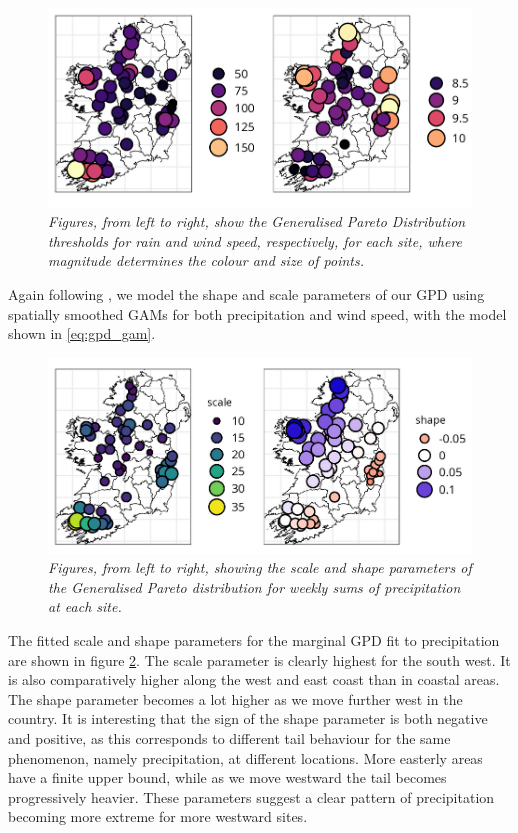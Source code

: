\documentclass{article}
\numberwithin{equation}{section}
\begin{document}
\begin{figure}[H]
    \centering
    \includegraphics[width = 0.9\linewidth]{plots/031_thresh_plots_crop.png}
    \caption{\emph{Figures, from left to right, show the Generalised Pareto Distribution thresholds for rain and wind speed, respectively, for each site, where magnitude determines the colour and size of points.}}
    \label{fig:03_uni_thresh}
\end{figure}


Again following \citet{Youngman2019}, we model the shape and scale parameters of our GPD using spatially smoothed GAMs for both precipitation and wind speed, with the model shown in \eqref{eq:gpd_gam}.

\begin{figure}[H]
    \centering
    \includegraphics[width = 0.9\linewidth]{plots/032_gpd_rain_crop.png}
    \caption{\emph{Figures, from left to right, showing the scale and shape parameters of the Generalised Pareto distribution for weekly sums of precipitation at each site.}}
    \label{fig:03_gpd_rain}
\end{figure}

The fitted scale and shape parameters for the marginal GPD fit to precipitation are shown in figure \ref{fig:03_gpd_rain}.
The scale parameter is clearly highest for the south west. 
It is also comparatively higher along the west and east coast than in coastal areas.
The shape parameter becomes a lot higher as we move further west in the country. 
It is interesting that the sign of the shape parameter is both negative and positive, as this corresponds to different tail behaviour for the same phenomenon, namely precipitation, at different locations.
More easterly areas have a finite upper bound, while as we move westward the tail becomes progressively heavier.
These parameters suggest a clear pattern of precipitation becoming more extreme for more westward sites.
\end{document}
